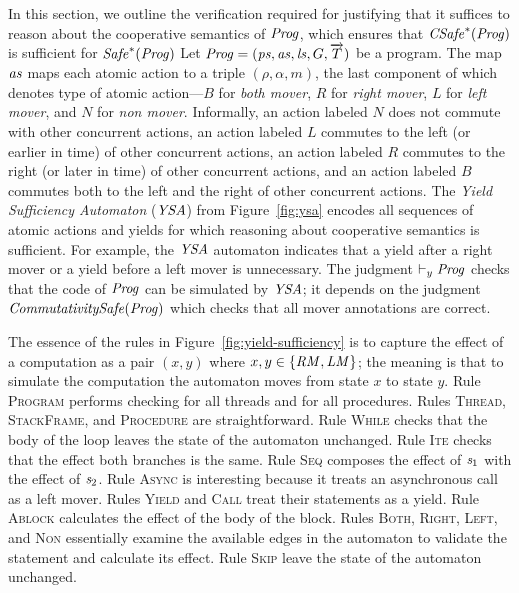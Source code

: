 In this section, we outline the verification required for justifying that it suffices to reason about
the cooperative semantics of $\mathit{Prog}$, which ensures that $\mathit{CSafe}^*(\mathit{Prog})$ is sufficient for $\mathit{Safe}^*(\mathit{Prog})$
Let $\mathit{Prog} = (\mathit{ps}, \mathit{as}, \mathit{ls}, G, \overrightarrow{T})$ be a program.
The map $\mathit{as}$ maps each atomic action to a triple $(\rho, \alpha, m)$, the last component of which 
denotes type of atomic action---$B$ for {\em both mover}, $R$ for {\em right mover}, $L$ for {\em left mover},
and $N$ for {\em non mover}.
Informally, an action labeled $N$ does not commute with other concurrent actions,
an action labeled $L$ commutes to the left (or earlier in time) of other concurrent actions,
an action labeled $R$ commutes to the right (or later in time) of other concurrent actions,
and an action labeled $B$ commutes both to the left and the right of other concurrent actions.
The {\em Yield Sufficiency Automaton\/} ($\mathit{YSA}$) from Figure~\ref{fig:ysa} encodes 
all sequences of atomic actions and yields for which reasoning about cooperative semantics is sufficient.
For example, the $\mathit{YSA}$ automaton indicates that a yield after a right mover or a yield before a left mover is unnecessary.
The judgment $\vdash_y \mathit{Prog}$ checks that the code of $\mathit{Prog}$ can be simulated by $\mathit{YSA}$;
it depends on the judgment $\mathit{CommutativitySafe}(\mathit{Prog})$ which checks that all mover annotations are correct.

The essence of the rules in Figure~\ref{fig:yield-sufficiency}
is to capture the effect of a computation as a pair $(x,y)$ where $x,y \in \{\mathit{RM},\mathit{LM}\}$;
the meaning is that to simulate the computation the automaton moves from state $x$ to state $y$.
Rule \textsc{Program} performs checking for all threads and for all procedures.
Rules \textsc{Thread}, \textsc{StackFrame}, and \textsc{Procedure} are straightforward.
Rule \textsc{While} checks that the body of the loop leaves the state of the automaton unchanged.
Rule \textsc{Ite} checks that the effect both branches is the same.
Rule \textsc{Seq} composes the effect of $\mathit{s}_1$ with the effect of $\mathit{s}_2$.
Rule \textsc{Async} is interesting because it treats an asynchronous call as a left mover.
Rules \textsc{Yield} and \textsc{Call} treat their statements as a yield.
Rule \textsc{Ablock} calculates the effect of the body of the block.
Rules \textsc{Both}, \textsc{Right}, \textsc{Left}, and \textsc{Non} essentially 
examine the available edges in the automaton to validate the statement and calculate its effect.
Rule \textsc{Skip} leave the state of the automaton unchanged.

